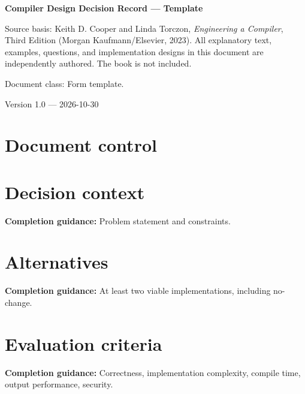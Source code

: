 \documentclass[10pt,letterpaper]{article}
\begin{document}
\hypersetup{pageanchor=false}%
\begin{titlepage}
\centering\vspace*{1.0in}
{\Huge\bfseries\textcolor{CompilerBlue}{Compiler Design Decision Record --- Template}\par}
\vspace{.22in}{\Large Authoring form and printable record\par}
\vspace{.4in}{\large Compiler Engineering Documentation Suite\par}
\vfill
\begin{minipage}{.86\linewidth}\small
Source basis: Keith D. Cooper and Linda Torczon, \emph{Engineering a Compiler}, Third Edition (Morgan Kaufmann/Elsevier, 2023). All explanatory text, examples, questions, and implementation designs in this document are independently authored. The book is not included.\par\medskip
Document class: Form template.
\end{minipage}
\vfill\textcolor{CompilerGray}{Version 1.0 --- 2026-10-30}\par
\end{titlepage}\hypersetup{pageanchor=true}
\tableofcontents\clearpage
\section{Document control}
\section{Decision context}
\textbf{Completion guidance:} Problem statement and constraints.\par\medskip{}
\section{Alternatives}
\textbf{Completion guidance:} At least two viable implementations, including no-change.\par\medskip{}
\section{Evaluation criteria}
\textbf{Completion guidance:} Correctness, implementation complexity, compile time, output performance, security.\par\medskip{}
\end{document}
